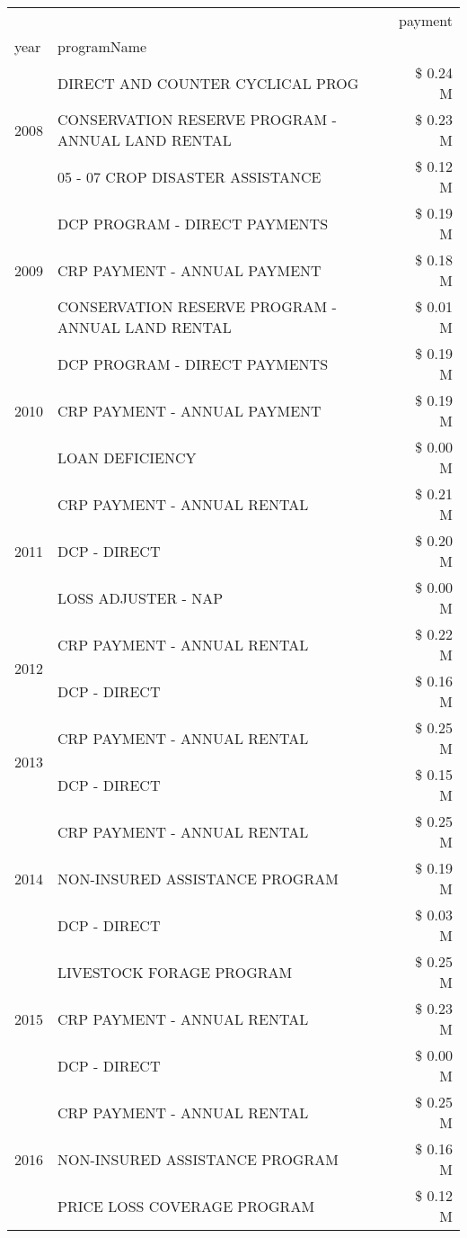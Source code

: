 \begin{tabular}{llr}
\toprule
 &  & payment \\
year & programName &  \\
\midrule
\multirow[t]{3}{*}{2008} & DIRECT AND COUNTER CYCLICAL PROG & \$ 0.24 M \\
 & CONSERVATION RESERVE PROGRAM - ANNUAL LAND RENTAL & \$ 0.23 M \\
 & 05 - 07 CROP DISASTER ASSISTANCE & \$ 0.12 M \\
\cline{1-3}
\multirow[t]{3}{*}{2009} & DCP PROGRAM - DIRECT PAYMENTS & \$ 0.19 M \\
 & CRP PAYMENT - ANNUAL PAYMENT & \$ 0.18 M \\
 & CONSERVATION RESERVE PROGRAM - ANNUAL LAND RENTAL & \$ 0.01 M \\
\cline{1-3}
\multirow[t]{3}{*}{2010} & DCP PROGRAM - DIRECT PAYMENTS & \$ 0.19 M \\
 & CRP PAYMENT - ANNUAL PAYMENT & \$ 0.19 M \\
 & LOAN DEFICIENCY & \$ 0.00 M \\
\cline{1-3}
\multirow[t]{3}{*}{2011} & CRP PAYMENT - ANNUAL RENTAL & \$ 0.21 M \\
 & DCP - DIRECT & \$ 0.20 M \\
 & LOSS ADJUSTER - NAP & \$ 0.00 M \\
\cline{1-3}
\multirow[t]{2}{*}{2012} & CRP PAYMENT - ANNUAL RENTAL & \$ 0.22 M \\
 & DCP - DIRECT & \$ 0.16 M \\
\cline{1-3}
\multirow[t]{2}{*}{2013} & CRP PAYMENT - ANNUAL RENTAL & \$ 0.25 M \\
 & DCP - DIRECT & \$ 0.15 M \\
\cline{1-3}
\multirow[t]{3}{*}{2014} & CRP PAYMENT - ANNUAL RENTAL & \$ 0.25 M \\
 & NON-INSURED ASSISTANCE PROGRAM & \$ 0.19 M \\
 & DCP - DIRECT & \$ 0.03 M \\
\cline{1-3}
\multirow[t]{3}{*}{2015} & LIVESTOCK FORAGE PROGRAM & \$ 0.25 M \\
 & CRP PAYMENT - ANNUAL RENTAL & \$ 0.23 M \\
 & DCP - DIRECT & \$ 0.00 M \\
\cline{1-3}
\multirow[t]{3}{*}{2016} & CRP PAYMENT - ANNUAL RENTAL                   & \$ 0.25 M \\
 & NON-INSURED ASSISTANCE PROGRAM                & \$ 0.16 M \\
 & PRICE LOSS COVERAGE PROGRAM                   & \$ 0.12 M \\

\end{tabular}
